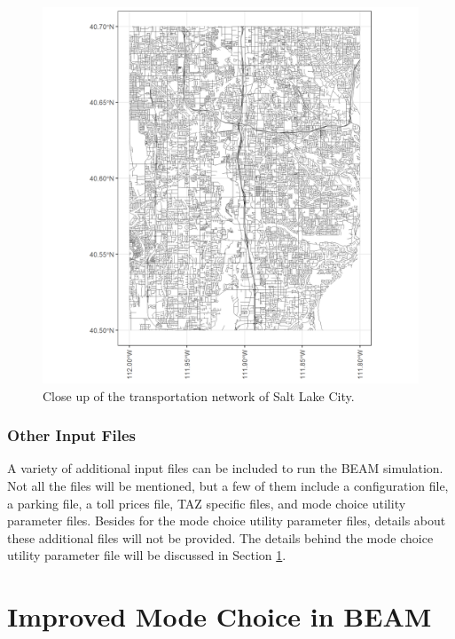 \documentclass[12pt, oneside, openright]{byuthesis}
\begin{document}
\begin{figure}

{\centering \includegraphics[width=480px]{pics/smallnetwork} 

}

\caption{Close up of the transportation network of Salt Lake City.}\label{fig:closent}
\end{figure}

\hypertarget{other-input-files}{%
\subsubsection{Other Input Files}\label{other-input-files}}

A variety of additional input files can be included to run the BEAM simulation. Not all the files will be mentioned, but a few of them include a configuration file, a parking file, a toll prices file, TAZ specific files, and mode choice utility parameter files. Besides for the mode choice utility parameter files, details about these additional files will not be provided. The details behind the mode choice utility parameter file will be discussed in Section \ref{mbeam}.

\hypertarget{mbeam}{%
\section{Improved Mode Choice in BEAM}\label{mbeam}}
\end{document}
